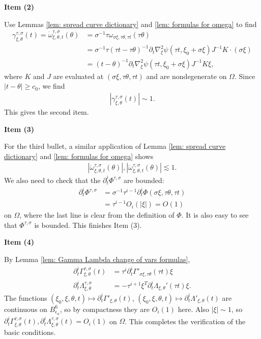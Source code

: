 \documentclass[12pt]{amsart}
\numberwithin{equation}{section}
\newcommand{\1}{\mathbbm{1}}
\newcommand{\Bphi}{B_{\epsilon_\phi}}
\begin{document}
\noindent \textbf{Item (2)}

Use Lemmas \ref{lem: spread curve dictionary} and \ref{lem: formulas for omega} to find 
\begin{align}
    \gamma_{\xi,\theta}^{\tau, \sigma}(t) = \dot \omega^{\tau, \sigma}_{\xi,\theta,t}(\theta) &= \sigma^{-1} \tau \omega_{\sigma \xi, \tau \theta, \tau t}(\tau \theta) \\
    &= \sigma^{-1} \tau (\tau t - \tau \theta)^{-1} \partial_t \nabla_\xi^2 \psi(\tau t, \xi_0 + \sigma \xi) J^{-1} K \cdot (\sigma \xi) \\
    &= (t - \theta)^{-1} \partial_t \nabla_\xi^2 \psi(\tau t, \xi_0 + \sigma \xi) J^{-1} K \xi,
\end{align}
where $K$ and $J$ are evaluated at $(\sigma \xi, \tau \theta, \tau t)$ and are nondegenerate on $\Omega$. Since $|t - \theta| \geq c_0$, we find
\begin{align}
    |\gamma_{\xi,\theta}^{\tau, \sigma}(t)| \sim 1.
\end{align}
This gives the second item. 

\noindent \textbf{Item (3)}

For the third bullet, a similar application of Lemma \ref{lem: spread curve dictionary} and \ref{lem: formulas for omega} shows 
\begin{align}
    |\ddot \omega^{\tau,\sigma}_{\xi,\theta,t}(\theta)|, |\dddot \omega^{\tau,\sigma}_{\xi,\theta,t}(\theta)| \lesssim 1. 
\end{align}
We also need to check that the $\partial_t^i \Phi^{\tau, \sigma}$ are bounded: 
\begin{align}
    \partial_t^i \Phi^{\tau,\sigma} &= \sigma^{-1} \tau^{i - 1} \partial_t^i \Phi(\sigma \xi, \tau \theta, \tau t) \\
    &= \tau^{i - 1} O_i(|\xi|) = O(1)
\end{align}
on $\Omega$, where the last line is clear from the definition of $\Phi$. It is also easy to see that $\Phi^{\tau, \sigma}$ is bounded. This finishes Item (3). 

\noindent \textbf{Item (4)}

By Lemma \ref{lem: Gamma Lambda change of vars formulas}, 
\begin{align}
    \partial_t^i \Gamma_{\xi,\theta}^{\tau, \sigma}(t) &= \tau^i \partial_t^i \Gamma'_{\sigma \xi,\tau \theta}(\tau t) \xi \\
    \partial_t^i \Lambda_{\xi,\theta}^{\tau,\sigma} &= -\tau^{i + 1} \xi^T \partial_t^i\Lambda_{\xi,\theta}'(\tau t) \xi. 
\end{align}
The functions $(\xi_0, \xi,\theta,t) \mapsto \partial_t^i \Gamma'_{\xi,\theta}(t)$, $(\xi_0, \xi, \theta, t) \mapsto \partial_t^i \Lambda'_{\xi,\theta}(t)$ are continuous on $\Bphi^6$, so by compactness they are $O_i(1)$ here. Also $|\xi| \sim 1$, so $\partial_t^i \Gamma_{\xi,\theta}^{\tau,\sigma}(t), \partial_t^i \Lambda_{\xi,\theta}^{\tau,\sigma}(t) = O_i(1)$ on $\Omega$. This completes the verification of the basic conditions. 
\end{document}
